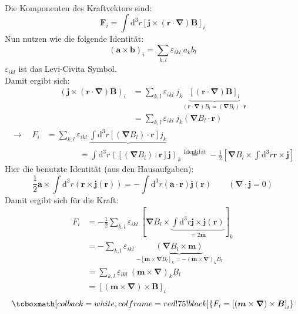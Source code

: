 \documentclass[titlepage,11pt,a4paper,ngerman]{report}
\newcommand{\tx}[1]{\textrm{#1}}
\newcommand{\ub}[1]{\underbrace{#1}}
\newcommand{\dd}{\tx{d}}
\renewcommand{\vec}[1]{\boldsymbol{#1}}
\renewcommand{\epsilon}{\varepsilon}
\newcommand{\vabla}{\boldsymbol{\nabla}}
\newcommand{\rmbox}[1]{\tcboxmath[colback=white,colframe=red!75!black]{#1}}
\begin{document}
\\
Die Komponenten des Kraftvektors sind:
\begin{equation*}
\vec{F}_i = \int \dd^3 r \left[\vec{j} \times (\vec{r} \cdot \vabla) \vec{B}\right]_i
\end{equation*}
Nun nutzen wie die folgende Identität:
\begin{equation*}
(\vec{a} \times \vec{b})_i = \sum_{k,l} \epsilon_{ikl} \ a_k b_l
\end{equation*}
$ \epsilon_{ikl} $ ist das Levi-Civita Symbol.\\
Damit ergibt sich:
\begin{align*}
\left(\vec{j} \times (\vec{r} \cdot \vabla) \vec{B}\right)_i &= \sum_{k,l} \epsilon_{ikl} \  j_k \ub{\left[(\vec{r} \cdot \vabla) \vec{B}\right]_l}_{(\vec{r} \cdot \vabla) B_l = (\vabla B_l) \cdot \vec{r}}\\
&= \sum_{k,l} \epsilon_{ikl} \ j_k (\vabla B_l \cdot \vec{r})
\end{align*}
\begin{align*}
\rightarrow \quad F_i &= \sum_{k,l} \epsilon_{ikl} \ \ub{\int \dd ^3 r \left[(\vabla B_l) \cdot \vec{r}\right] j_k}\\
&\qquad \qquad = \int \dd^3 r \left( \left[(\vabla B_l) \cdot \vec{r}\right] \vec{j}\right)_k \overset{\tx{Identität}}{=} - \frac{1}{2} \left[\vabla B_l \times \int \dd^3 r \vec{r} \times \vec{j} \right]
\end{align*}
Hier die benutzte Identität (aus den Hausaufgaben):
\begin{equation*}
\frac{1}{2} \vec{a} \times \int \dd ^3 r (\vec{r} \times \vec{j} (\vec{r})) = - \int \dd^3 r (\vec{a} \cdot \vec{r}) \vec{j}(\vec{r}) \qquad (\vabla \cdot \vec{j} = 0)
\end{equation*}
Damit ergibt sich für die Kraft:
\begin{align*}
F_i &= - \frac{1}{2} \sum_{k,l} \epsilon_{ikl} \ \left[\vabla B_l \times \ub{\int \dd^3 r \vec{j} \times \vec{j}(\vec{r})}_{=2 \vec{m}}\right]_k \\
&= - \sum_{k,l} \epsilon_{ikl} \ \ub{\left(\vabla B_l \times \vec{m}\right)}_{- \left[\vec{m} \times \vabla B_l\right]_k = - (\vec{m} \times \vabla)_k B_l}\\
&= \sum_{k,l} \epsilon_{ikl} \ (\vec{m} \times \vabla)_k B_l\\
&= \left[(\vec{m} \times \vabla) \times \vec{B}\right]_i
\end{align*}
\begin{equation*}
\rmbox{F_i = \left[(\vec{m} \times \vabla) \times \vec{B}\right]_i}
\end{equation*}
\end{document}
